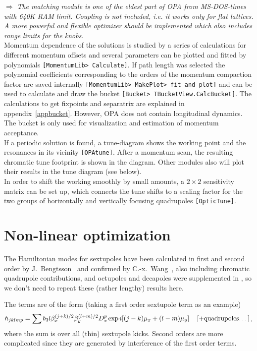 \documentclass[12pt]{article}
\newcommand\beq{\begin{equation}}
\newcommand\eeq{\end{equation}}
\newcommand\todo[1]{$\Longrightarrow$ {\em #1} }
\newcommand\code[1]{{\tt [#1]}}
\begin{document}
\todo{The matching module is one of the eldest part of OPA from MS-DOS-times with 640K RAM limit. Coupling is not included, i.e. it works only for flat lattices. A more powerful and flexible optimizer should be implemented which also includes range limits for the knobs.} \\

Momentum dependence of the solutions is studied by a series of calculations for different momentum offsets and several parameters can be plotted and fitted by polynomials \code{MomentumLib> Calculate}. If path length was selected the polynomial coefficients corresponding to the orders of the momentum compaction factor are saved internally \code{MomentumLib> MakePlot> fit\_and\_plot} and can be used to calculate and draw the bucket \code{Bucket> TBucketView.CalcBucket}. The calculations to get fixpoints and separatrix are explained in appendix~\ref{appbucket}. However, OPA does not contain longitudinal dynamics. The bucket is only used for visualization and estimation of momentum acceptance.\\

If a periodic solution is found, a tune-diagram shows the working point and the resonances in its vicinity \code{OPAtune}. After a momentum scan, the resulting chromatic tune footprint is shown in the diagram. Other modules also will plot their results in the tune diagram (see below).\\

In order to shift the working smoothly by small amounts, a $2\times 2$ sensitivity matrix can be set up, which connects the tune shifts to a scaling factor for the two groups of horizontally and vertically focusing quadrupoles \code{OpticTune}.


\section{Non-linear optimization}
The Hamiltonian modes for sextupoles have been calculated in first and second order by J.~Bengtsson~\cite{jbthesis,jbsls} and confirmed by C.-x.~Wang~\cite{WANG}, also including chromatic quadrupole contributions, and octupoles and decapoles were supplemented in \cite{SLAS}, so we don't need to repeat these (rather lengthy) results here.

The terms are of the form (taking a first order sextupole term as an example)
\beq
h_{jklmp} = \sum b_3l \beta_x^{(j+k)/2} \beta_y^{(l+m)/2} D_x^p \exp i [ (j-k)\mu_x + (l-m)\mu_y ] \quad \left[ + \mbox{\rm quadrupoles\dots } \right],
\eeq
where the sum is over all (thin) sextupole kicks. Second orders are more complicated since they are generated by interference of the first order terms.
\end{document}
